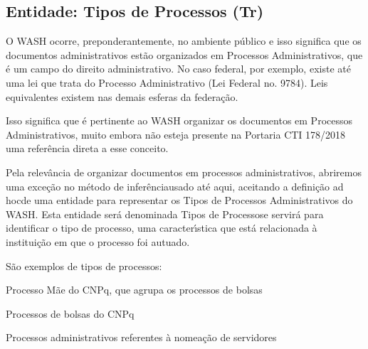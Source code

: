 \documentclass[
12pt,		%
openright,	%
twoside,  %
a4paper,			%
chapter=TITLE,		%
english,			%
french,				%
spanish,			%
brazil				%
]{USPSC-classe/USPSC}
\begin{document}
\subsection[Entidade: Tipos de Processos (Tr)]{Entidade: Tipos de Processos (Tr)}\label{Entidade: Tipos de Processos (Tr)}
O WASH ocorre, preponderantemente, no ambiente p\'ublico e isso significa que os documentos administrativos est\~ao organizados em Processos Administrativos, que \'e um campo do direito administrativo. No caso federal, por exemplo, existe at\'e uma lei que trata do Processo Administrativo (Lei Federal no. 9784). Leis equivalentes existem nas demais esferas da federa\c{c}\~ao.









Isso significa que \'e pertinente ao WASH organizar os documentos em Processos Administrativos, muito embora n\~ao esteja presente na Portaria CTI 178/2018 uma refer\^encia direta a esse conceito.









Pela relev\^ancia de organizar documentos em processos administrativos, abriremos uma exce\c{c}\~ao no \textquotedbl m\'etodo de infer\^encia\textquotedbl  usado at\'e aqui, aceitando a defini\c{c}\~ao \textquotedbl ad hoc\textquotedbl  de uma entidade para representar os Tipos de Processos Administrativos do WASH. Esta entidade ser\'a denominada \textquotedbl Tipos de Processos\textquotedbl  e servir\'a para identificar o tipo de processo, uma caracter\'{\i}stica que est\'a relacionada \`a institui\c{c}\~ao em que o processo foi autuado.









S\~ao exemplos de tipos de processos:










\begin{alineas}
\item Processo M\~ae do CNPq, que agrupa os processos de bolsas
\item Processos de bolsas do CNPq
\item Processos administrativos referentes \`a nomea\c{c}\~ao de servidores
\end{alineas}
\end{document}
